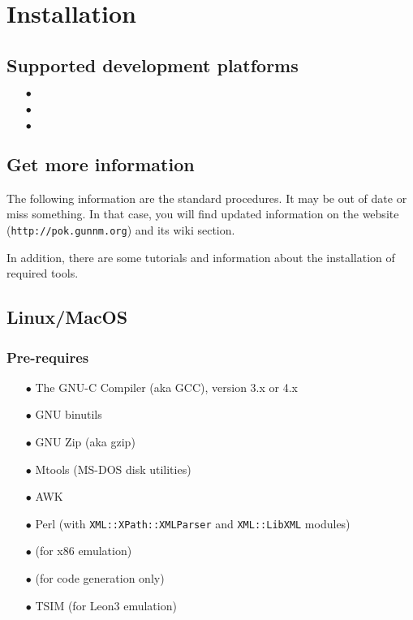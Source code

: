 %
%
%
%
%

\chapter{Installation}
   \label{chapter-installation}
   \section{Supported development platforms}
   \begin{itemize}
      \item[$\bullet$] \linux
      \item[$\bullet$] \macosx
      \item[$\bullet$] \windows
   \end{itemize}

   \section{Get more information}
   The following information are the standard procedures. It may be out of date
   or miss something. In that case, you will find updated information on the
   \pok website (\texttt{http://pok.gunnm.org}) and its wiki section.

   In addition, there are some tutorials and information about the installation
   of required tools.

   \section{Linux/MacOS}
      \subsection{Pre-requires}
      \begin{itemize}
         \item[$\bullet$] The GNU-C Compiler (aka GCC), version 3.x or 4.x
         \item[$\bullet$] GNU binutils
         \item[$\bullet$] GNU Zip (aka gzip)
         \item[$\bullet$] Mtools (MS-DOS disk utilities)
         \item[$\bullet$] AWK
         \item[$\bullet$] Perl (with \texttt{XML::XPath::XMLParser} and
            \texttt{XML::LibXML} modules)
         \item[$\bullet$] \qemu (for x86 emulation)
         \item[$\bullet$] \ocarina (for code generation only)
         \item[$\bullet$] TSIM (for Leon3 emulation)
      \end{itemize}

